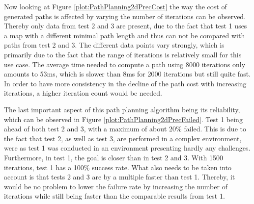 

Now looking at Figure \ref{plot:PathPlanning2dPrecCost} the way the cost of generated paths is affected by varying the number of iterations can be observed. Thereby only data from test 2 and 3 are present, due to the fact that test 1 uses a map with a different minimal path length and thus can not be compared with paths from test 2 and 3. The different data points vary strongly, which is primarily due to the fact that the range of iterations is relatively small for this use case. The average time needed to compute a path using 8000 iterations only amounts to 53ms, which is slower than 8ms for 2000 iterations but still quite fast. In order to have more consistency in the decline of the path cost with increasing iterations, a higher iteration count would be needed.



The last important aspect of this path planning algorithm being its reliability, which can be observed in Figure \ref{plot:PathPlanning2dPrecFailed}. Test 1 being ahead of both test 2 and 3, with a maximum of about 20\% failed. This is due to the fact that test 2, as well as test 3, are performed in a complex environment, were as test 1 was conducted in an environment presenting hardly any challenges. Furthermore, in test 1, the goal is closer than in test 2 and 3. With 1500 iterations, test 1 has a 100\% success rate. What also needs to be taken into account is that tests 2 and 3 are by a multiple faster than test 1. Thereby, it would be no problem to lower the failure rate by increasing the number of iterations while still being faster than the comparable results from test 1.



